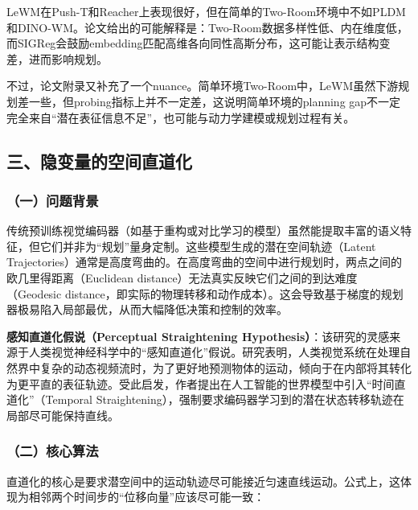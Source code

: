 LeWM在Push-T和Reacher上表现很好，但在简单的Two-Room环境中不如PLDM和DINO-WM。论文给出的可能解释是：Two-Room数据多样性低、内在维度低，而SIGReg会鼓励embedding匹配高维各向同性高斯分布，这可能让表示结构变差，进而影响规划。

不过，论文附录又补充了一个nuance。简单环境Two-Room中，LeWM虽然下游规划差一些，但probing指标上并不一定差，这说明简单环境的planning gap不一定完全来自``潜在表征信息不足''，也可能与动力学建模或规划过程有关。

\hypertarget{ux4e09ux9690ux53d8ux91cfux7684ux7a7aux95f4ux76f4ux9053ux5316}{%
\subsection{三、隐变量的空间直道化}\label{ux4e09ux9690ux53d8ux91cfux7684ux7a7aux95f4ux76f4ux9053ux5316}}

\hypertarget{ux4e00ux95eeux9898ux80ccux666f-9}{%
\subsubsection{（一）问题背景}\label{ux4e00ux95eeux9898ux80ccux666f-9}}

传统预训练视觉编码器（如基于重构或对比学习的模型）虽然能提取丰富的语义特征，但它们并非为``规划''量身定制。这些模型生成的潜在空间轨迹（Latent Trajectories）通常是高度弯曲的。在高度弯曲的空间中进行规划时，两点之间的欧几里得距离（Euclidean distance）无法真实反映它们之间的到达难度（Geodesic distance，即实际的物理转移和动作成本）。这会导致基于梯度的规划器极易陷入局部最优，从而大幅降低决策和控制的效率。

\textbf{感知直道化假说（Perceptual Straightening Hypothesis）}：该研究的灵感来源于人类视觉神经科学中的``感知直道化''假说。研究表明，人类视觉系统在处理自然界中复杂的动态视频流时，为了更好地预测物体的运动，倾向于在内部将其转化为更平直的表征轨迹。受此启发，作者提出在人工智能的世界模型中引入``时间直道化''（Temporal Straightening），强制要求编码器学习到的潜在状态转移轨迹在局部尽可能保持直线。

\hypertarget{ux4e8cux6838ux5fc3ux7b97ux6cd5-1}{%
\subsubsection{（二）核心算法}\label{ux4e8cux6838ux5fc3ux7b97ux6cd5-1}}

直道化的核心是要求潜空间中的运动轨迹尽可能接近匀速直线运动。公式上，这体现为相邻两个时间步的``位移向量''应该尽可能一致：

